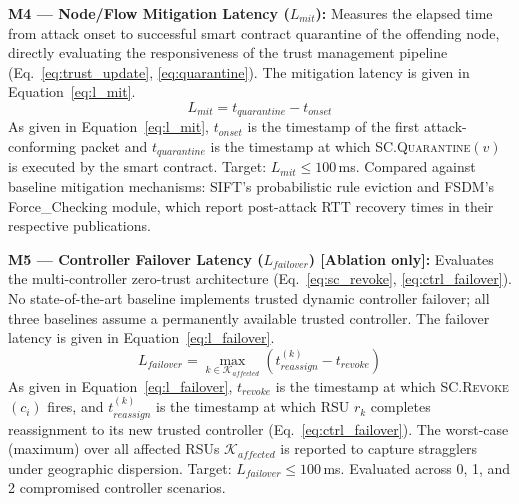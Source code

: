 \documentclass[12pt, a4paper]{report}
\begin{document}
{{%

\textbf{M4 — Node/Flow Mitigation Latency
($L_{mit}$):}
Measures the elapsed time from attack onset to
successful smart contract quarantine of the offending
node, directly evaluating the responsiveness of the
trust management pipeline
(Eq.~\ref{eq:trust_update}, \ref{eq:quarantine}).
The mitigation latency is given in
Equation~\eqref{eq:l_mit}.
\begin{equation}
L_{mit} = t_{quarantine} - t_{onset}
\label{eq:l_mit}
\end{equation}
As given in Equation~\eqref{eq:l_mit},
$t_{onset}$ is the timestamp of the first
attack-conforming packet and $t_{quarantine}$ is the
timestamp at which \textsc{SC.Quarantine}$(v)$ is
executed by the smart contract. Target: $L_{mit}
\leq 100$\,ms. Compared against baseline mitigation
mechanisms: SIFT's probabilistic rule eviction and
FSDM's Force\_Checking module, which report
post-attack RTT recovery times in their respective
publications.



\textbf{M5 — Controller Failover Latency
($L_{failover}$) [Ablation only]:}
Evaluates the multi-controller zero-trust architecture
(Eq.~\ref{eq:sc_revoke}, \ref{eq:ctrl_failover}).
No state-of-the-art baseline implements trusted
dynamic controller failover; all three baselines assume
a permanently available trusted controller.
The failover latency is given in
Equation~\eqref{eq:l_failover}.
\begin{equation}
L_{failover} =
\underset{k \in \mathcal{K}_{affected}}{\max}
\left(
t_{reassign}^{(k)} - t_{revoke}
\right)
\label{eq:l_failover}
\end{equation}
As given in Equation~\eqref{eq:l_failover},
$t_{revoke}$ is the timestamp at which
\textsc{SC.Revoke}$(c_i)$ fires, and
$t_{reassign}^{(k)}$ is the timestamp at which
\ac{RSU} $r_k$ completes reassignment to its new
trusted controller (Eq.~\ref{eq:ctrl_failover}).
The worst-case (maximum) over all affected RSUs
$\mathcal{K}_{affected}$ is reported to capture
stragglers under geographic dispersion. Target:
$L_{failover} \leq 100$\,ms. Evaluated across
0, 1, and 2 compromised controller scenarios.


}}
\end{document}

